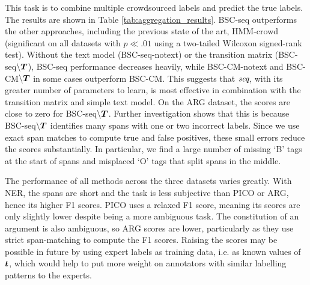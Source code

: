 This task is to combine multiple crowdsourced labels and predict the true labels.
The results are shown in Table \ref{tab:aggregation_results}.
BSC-seq outperforms the other approaches,
including the previous state of the art, HMM-crowd (significant on all datasets
 with $p\ll.01$ using a two-tailed Wilcoxon signed-rank test).
Without the text model (BSC-seq-notext) or the transition matrix (BSC-seq$\backslash\boldsymbol T$),
BSC-seq performance decreases heavily,
while BSC-CM-notext and BSC-CM$\backslash\boldsymbol T$ in some cases outperform
BSC-CM.
This suggests that $\emph{seq}$, with its greater number of parameters to learn, 
is most effective in combination with the transition matrix and simple text model.
On the ARG dataset, the scores are close to zero for BSC-seq$\backslash\boldsymbol T$.
Further investigation shows that this is because 
BSC-seq$\backslash\boldsymbol T$ identifies many spans with one 
or two incorrect labels. Since we use exact span matches to compute true
and false positives, these small errors reduce the scores substantially.
In particular, we find a large number of missing ‘B’ tags at the start of spans
and misplaced ‘O’ tags that split spans in the middle.

The performance of all methods across the three datasets varies greatly.
With NER, the spans are short and the task is less subjective than PICO or ARG,
hence its higher F1 scores. PICO uses a relaxed F1 score, meaning its scores are
only slightly lower despite being a more ambiguous task. The constitution of an 
argument is also ambiguous, so ARG scores are lower, particularly as they use  
strict span-matching to compute the F1 scores. Raising the scores may be possible in future
by using expert labels as training data, i.e. as known values of $\boldsymbol t$,
which would help to put more weight on annotators with similar labelling 
patterns to the experts.

